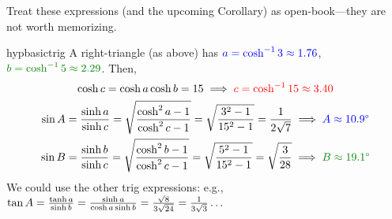 Treat these expressions (and the upcoming Corollary) as open-book---they are not worth memorizing.

\begin{examples}{}{hypbasictrig}
	\exstart A right-triangle (as above) has $\textcolor{blue}{a=\cosh^{-1}3\approx 1.76}$, \ $\textcolor{Green}{b=\cosh^{-1}5\approx 2.29}$. Then,
	\begin{gather*}
		\cosh c=\cosh a\cosh b=15\implies \textcolor{red}{c=\cosh^{-1}15\approx 3.40}\\
		\sin A=\frac{\sinh a}{\sinh c} =\sqrt{\frac{\cosh^2a-1}{\cosh^2 c-1}} =\sqrt{\frac{3^2-1}{15^2-1}} =\frac 1{2\sqrt 7} \implies \textcolor{blue}{A\approx \ang{10.9}}\\
		\sin B=\frac{\sinh b}{\sinh c} =\sqrt{\frac{\cosh^2b-1}{\cosh^2 c-1}} =\sqrt{\frac{5^2-1}{15^2-1}}=\sqrt{\frac 3{28}} \implies \textcolor{Green}{B\approx \ang{19.1}}
	\end{gather*}
	We could use the other trig expressions: e.g., $\tan A=\smash{\frac{\tanh a}{\sinh b}=\frac{\sinh a}{\cosh a\sinh b}=\frac{\sqrt 8}{3\sqrt{24}} =\frac 1{3\sqrt 3} \ldots}$
	
	
	\goodbreak
	

\end{examples}
